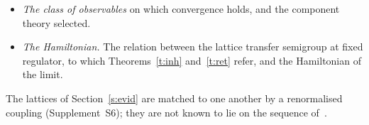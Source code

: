 \begin{itemize}
The free theory shows that the difference is not a matter of convention when many scales are blocked at
once: with coarse links that are sums of fine links the fine detail is not bounded by the energy uniformly
in the blocking factor (Proposition~\ref{p:linesum}), and with a smooth block average it is
(Proposition~\ref{p:freeblock}). This is a statement about the free calibration and about one uniform
estimate. It does not prove that averaged block variables are necessary for the interacting non-abelian
theory; it makes an average of parallel transports, of the kind used in renormalisation-group
constructions, the motivated candidate for the one-step form of Proposition~\ref{p:onestep}, in preference
to the product of links along one line.
\item \emph{The class of observables} on which convergence holds, and the component theory selected.
\item \emph{The Hamiltonian.} The relation between the lattice transfer semigroup at fixed regulator, to which
Theorems~\ref{t:inh} and~\ref{t:ret} refer, and the Hamiltonian of the limit.
\end{itemize}
The lattices of Section~\ref{s:evid} are matched to one another by a renormalised coupling (Supplement~S6);
they are not known to lie on the sequence of~\cite{OAI}.

